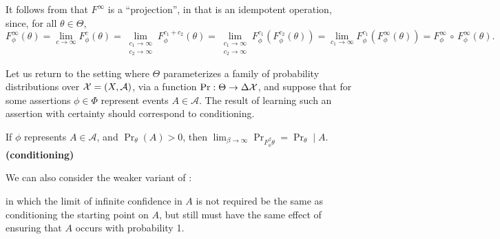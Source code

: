 \documentclass{article}
\DeclareMathOperator{\supp}{\mathrm{Supp}}
\begin{document}
It follows from  that
$F^\infty$
is a ``projection'', in that is an idempotent operation, since,
for all $\theta \in \Theta$,
\[
    F^\infty_\phi (\theta)
        = \lim_{c \to \infty} F^{c}_\phi (\theta)
        = \lim_{\substack{c_1 \to \infty \\ c_2 \to \infty}}
            F^{c_1 + c_2}_\phi (\theta)
        = \lim_{\substack{c_1 \to \infty \\ c_2 \to \infty}}
            F^{c_1}_\phi ( F^{c_2}_\phi (\theta))
        = \lim_{c_1 \to \infty} F^{c_1}_\phi (F^{\infty}_\phi(\theta))
        = F^\infty_\phi \,\circ\, F^\infty_\phi  (\theta)
        .
\]

Let us return to the setting where $\Theta$ parameterizes a family of probability distributions over $\mathcal X = (X, \mathcal A)$, via a function $\Pr : \Theta \to \Delta\mathcal X$,
and suppose that for some assertions $\phi \in \Phi$ represent events $A \in \mathcal A$.
The result of learning such an assertion with certainty should correspond to conditioning.

\begin{CFaxioms}
    \item If $\phi$ represents $A \in \mathcal A$, and $\Pr_{\theta}(A) > 0$, then
        $\displaystyle \lim_{\beta\to\infty} \Pr_{ F^\beta_\phi\theta } = \Pr_\theta \mid A$.
        \hfill \textbf{(conditioning)} \label{ax:conditioning}

\end{CFaxioms}


We can also consider the weaker variant of :
in which the limit of infinite confidence in $A$ is not required be the same as conditioning the starting point on $A$, but still must have the same effect of ensuring that $A$ occurs with probability 1.
\end{document}
